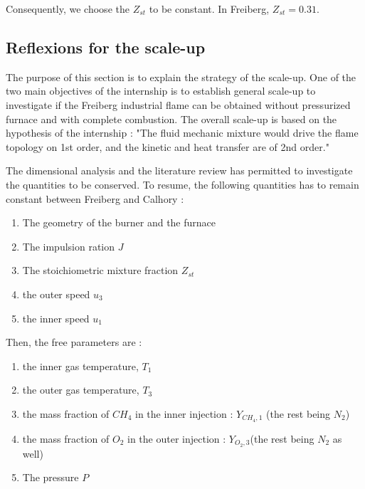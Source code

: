 Consequently, we choose the $Z_{st}$ to be constant. In Freiberg, $Z_{st}=0.31$.

\subsection{Reflexions for the scale-up}

The purpose of this section is to explain the strategy of the scale-up. One of the two main objectives of the internship is to establish general scale-up to investigate if the Freiberg industrial flame can be obtained without pressurized furnace and with complete combustion. The overall scale-up is based on the hypothesis of the internship : "The fluid mechanic mixture would drive the flame topology on 1st order, and the kinetic and heat transfer are of 2nd order."


The dimensional analysis and the literature review has permitted to investigate the quantities to be conserved. To resume, the following quantities has to remain constant between Freiberg and Calhory :
\begin{enumerate}
\item The geometry of the burner and the furnace
\item The impulsion ration $ J$
\item The  stoichiometric mixture fraction $Z_{st}$
\item the outer speed $u_{3}$
\item the inner speed $u_{1}$

\end{enumerate}
Then, the free parameters are :
\begin{enumerate}
\item the inner gas temperature, $T_{1}$
\item the outer gas temperature, $T_{3}$
\item the mass fraction of $CH_{4}$ in the inner injection : $Y_{CH_{4},1}$ (the rest being $N_{2}$)
\item  the mass fraction of $O_{2}$ in the outer injection : $Y_{O_{2},3}$(the rest being $N_{2}$ as well)
\item The pressure $P$
\end{enumerate}


